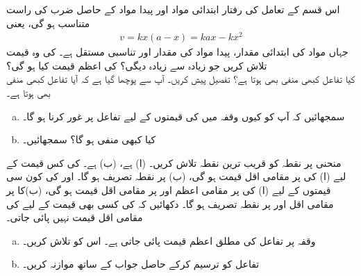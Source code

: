 اس قسم کے تعامل کی رفتار  ابتدائی مواد اور پیدا مواد کے حاصل ضرب کی  راست متناسب ہو گی، یعنی
\begin{align*}
v=kx(a-x)=kax-kx^2
\end{align*} 
جہاں  مواد کی ابتدائی مقدار،  پیدا مواد کی مقدار اور  تناسبی مستقل ہے۔ کی وہ قیمت تلاش کریں جو زیادہ سے زیادہ   دیگی؟  کی اعظم قیمت کیا ہو گی؟
\\
کیا تفاعل  کبھی منفی بھی ہوتا ہے؟ تفصیل پیش کریں۔
آپ سے پوچھا گیا ہے کہ آیا تفاعل  کبھی منفی بھی ہوتا ہے۔
\begin{enumerate}[a.]
\item
سمجھائیں کہ آپ کو  کیوں وقفہ  میں  کی قیمتوں کے لیے تفاعل پر غور کرنا ہو گا۔
\item
کیا  کبھی منفی ہو گا؟ سمجھائیں۔
\end{enumerate}
منحنی  پر نقطہ  کو  قریب ترین نقطہ تلاش کریں۔ (ا)  ہے، (ب)  ہے۔
 کی کس قیمت کے لیے  (ا)  کی  پر مقامی اقل قیمت ہو گی، (ب)  پر نقطہ تصریف ہو گا۔
 اور  کی کون سی قیمتوں کے لیے   (ا)  کی  پر مقامی اعظم اور  پر مقامی اقل قیمت ہو گی، (ب)کا   پر مقامی اقل اور  پر نقطہ تصریف ہو گا۔
دکھائیں کہ  کی کسی بھی قیمت کے لیے  کی مقامی اقل قیمت نہیں پائی جاتی۔
\begin{enumerate}[a.]
\item
وقفہ  پر تفاعل  کی مطلق اعظم قیمت پائی جاتی ہے۔ اس کو تلاش کریں۔
\item
تفاعل کو ترسیم کرکے  حاصل جواب کے ساتھ موازنہ کریں۔
\end{enumerate}
